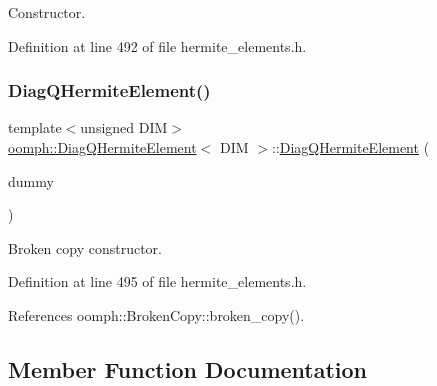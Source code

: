 Constructor. 



Definition at line 492 of file hermite\+\_\+elements.\+h.

\mbox{\label{classoomph_1_1DiagQHermiteElement_aba6e3c5c6b6219bba7e073f25c3ae994}} 
\subsubsection{\texorpdfstring{Diag\+Q\+Hermite\+Element()}{DiagQHermiteElement()}\hspace{0.1cm}{\footnotesize\ttfamily [2/2]}}
{\footnotesize\ttfamily template$<$unsigned D\+IM$>$ \\
\hyperlink{classoomph_1_1DiagQHermiteElement}{oomph\+::\+Diag\+Q\+Hermite\+Element}$<$ D\+IM $>$\+::\hyperlink{classoomph_1_1DiagQHermiteElement}{Diag\+Q\+Hermite\+Element} (\begin{DoxyParamCaption}\item[{const \hyperlink{classoomph_1_1DiagQHermiteElement}{Diag\+Q\+Hermite\+Element}$<$ D\+IM $>$ \&}]{dummy }\end{DoxyParamCaption})\hspace{0.3cm}{\ttfamily [inline]}}



Broken copy constructor. 



Definition at line 495 of file hermite\+\_\+elements.\+h.



References oomph\+::\+Broken\+Copy\+::broken\+\_\+copy().



\subsection{Member Function Documentation}
\mbox{\label{classoomph_1_1DiagQHermiteElement_a07bdc47a91aba325c148acae357b9365}} 
